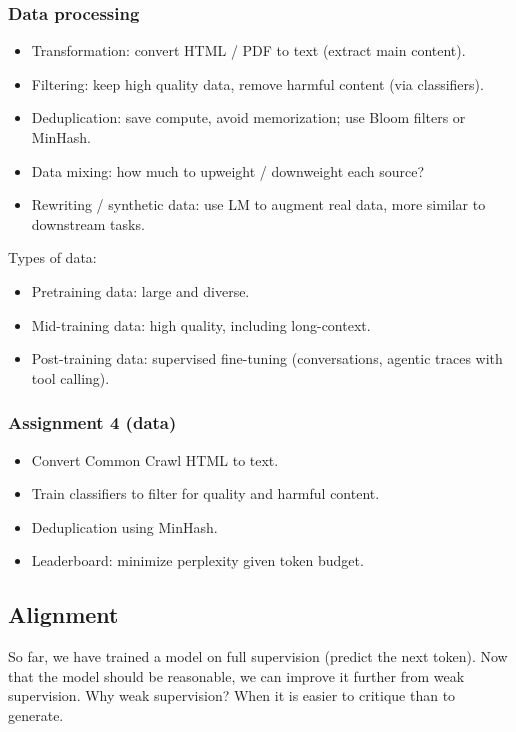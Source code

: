 \documentclass[12pt,twoside]{article}
\begin{document}
\subsubsection*{Data processing}

\begin{itemize}
    \item Transformation: convert HTML / PDF to text (extract main content).
    \item Filtering: keep high quality data, remove harmful content (via classifiers).
    \item Deduplication: save compute, avoid memorization; use Bloom filters or MinHash.
    \item Data mixing: how much to upweight / downweight each source?
    \item Rewriting / synthetic data: use LM to augment real data, more similar to downstream tasks.
\end{itemize}

Types of data:

\begin{itemize}
    \item Pretraining data: large and diverse.
    \item Mid-training data: high quality, including long-context.
    \item Post-training data: supervised fine-tuning (conversations, agentic traces with tool calling).
\end{itemize}

\subsubsection*{Assignment 4 (data)}

\begin{itemize}
    \item Convert Common Crawl HTML to text.
    \item Train classifiers to filter for quality and harmful content.
    \item Deduplication using MinHash.
    \item Leaderboard: minimize perplexity given token budget.
\end{itemize}

\subsection*{Alignment}

So far, we have trained a model on full supervision (predict the next token). Now that the model should be reasonable, we can improve it further from weak supervision. Why weak supervision? When it is easier to critique than to generate. \\
\end{document}
